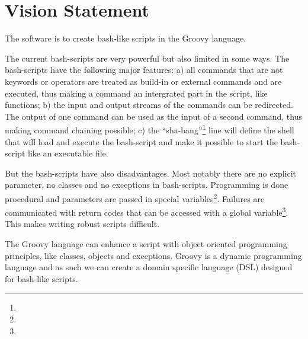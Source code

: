 \section{Vision Statement}

The software is to create bash-like scripts in the Groovy language.

The current bash-scripts are very powerful but also limited in some ways.
The bash-scripts have the following major features: a) all commands that are not
keywords or operators are treated as build-in or external commands and are
executed, thus making a command an intergrated part in the script, like
functions; b) the input and output streams of the commands can be redirected. The
output of one command can be used as the input of a second command, thus making
command chaining possible; c) the ``sha-bang''\footnote{} line 
will define the shell that will load
and execute the bash-script and make it possible to start the bash-script like an
executable file.

But the bash-scripts have also disadvantages. Most notably there are no 
explicit parameter, no classes and no exceptions in bash-scripts. Programming 
is done procedural and parameters are passed in special 
variables\footnote{}. Failures are communicated with
return codes that can be accessed with a global variable\footnote{}.
This makes writing robust scripts difficult.

The Groovy language can enhance a script with 
object oriented programming principles, like classes, objects and exceptions.
Groovy is a dynamic programming language and as such we can create a domain 
specific language (DSL) designed for bash-like scripts.
